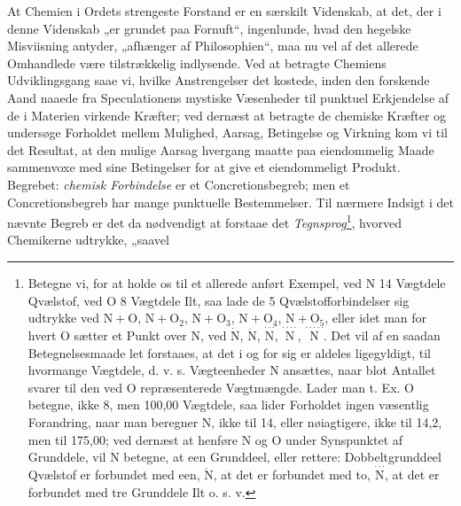 \documentclass[12pt,a4paper]{book}
\begin{document}
At Chemien i Ordets strengeste Forstand er en særskilt Videnskab,
at det, der i denne Videnskab „er grundet paa Fornuft“, ingenlunde,
hvad den hegelske Misviisning antyder, „afhænger af Philosophien“,
maa nu vel af det allerede Omhandlede være tilstrækkelig
indlysende. Ved at betragte Chemiens Udviklingsgang saae vi, hvilke
Anstrengelser det kostede, inden den forskende Aand naaede fra
Speculationens mystiske Væsenheder til punktuel Erkjendelse af de i
Materien virkende Kræfter; ved dernæst at betragte de chemiske
Kræfter og undersøge Forholdet mellem Mulighed, Aarsag, Betingelse
og Virkning kom vi til det Resultat, at den mulige Aarsag hvergang
maatte paa eiendommelig Maade sammenvoxe med sine Betingelser for
at give et eiendommeligt Produkt. Begrebet: \emph{chemisk
Forbindelse} er et Concretionsbegreb; men et Concretionsbegreb har
mange punktuelle Bestemmelser. Til nærmere Indsigt i det nævnte
Begreb er det da nødvendigt at forstaae
\setcounter{footnote}{0}
det \emph{Tegnsprog}\footnote{Betegne vi, for at holde os til et
allerede anført Exempel, ved $\mathrm{N}$ 14 Vægtdele Qvælstof, ved
$\mathrm{O}$ 8 Vægtdele Ilt, saa lade de 5 Qvælstofforbindelser sig
udtrykke ved $\mathrm{N} + \mathrm{O}$, $\mathrm{N} +
\mathrm{O}_{2}$, $\mathrm{N} + \mathrm{O}_{3}$, $\mathrm{N} +
\mathrm{O}_{4}$, $\mathrm{N} + \mathrm{O}_{5}$, eller idet man for
hvert $\mathrm{O}$ sætter et Punkt over $\mathrm{N}$, ved
$\dot{\mathrm{N}}$, $\ddot{\mathrm{N}}$,
$\stackrel{\cdot\cdot\cdot}{\mathrm{N}}$,
$\stackrel{\cdot\cdot\cdot\cdot}{\mathrm{N}}$,
$\stackrel{\cdot\cdot\cdot\cdot\cdot}{\mathrm{N}}$. Det vil af en
saadan Betegnelsesmaade let forstaaes, at det i og for sig er
aldeles ligegyldigt, til hvormange Vægtdele, d. v. s. Vægteenheder
$\mathrm{N}$ ansættes, naar blot Antallet svarer til den ved
$\mathrm{O}$ repræsenterede Vægtmængde. Lader man t. Ex.
$\mathrm{O}$ betegne, ikke 8, men 100,00 Vægtdele, saa lider
Forholdet ingen væsentlig Forandring, naar man beregner
$\mathrm{N}$, ikke til 14, eller nøiagtigere, ikke til 14,2, men
til 175,00; ved dernæst at henføre $\mathrm{N}$ og $\mathrm{O}$
under Synspunktet af Grunddele, vil $\dot{\mathrm{N}}$ betegne, at
een Grunddeel, eller rettere: Dobbeltgrunddeel Qvælstof er
forbundet med een, $\ddot{\mathrm{N}}$, at det er forbundet med to,
$\stackrel{\cdot\cdot\cdot}{\mathrm{N}}$, at det er forbundet med
tre Grunddele Ilt o. s. v.}, hvorved Chemikerne udtrykke, „saavel
\end{document}
